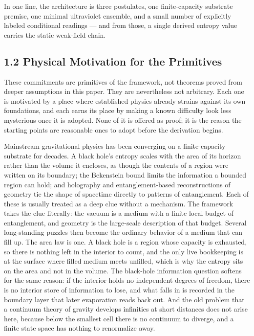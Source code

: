 \documentclass[11pt]{article}
\begin{document}
In one line, the architecture is three postulates, one finite-capacity substrate premise, one minimal ultraviolet ensemble, and a small number of explicitly labeled conditional readings --- and from those, a single derived entropy value carries the static weak-field chain.

\subsection{1.2 Physical Motivation for the Primitives}

These commitments are primitives of the framework, not theorems proved from deeper assumptions in this paper. They are nevertheless not arbitrary. Each one is motivated by a place where established physics already strains against its own foundations, and each earns its place by making a known difficulty look less mysterious once it is adopted. None of it is offered as proof; it is the reason the starting points are reasonable ones to adopt before the derivation begins.

Mainstream gravitational physics has been converging on a finite-capacity substrate for decades. A black hole's entropy scales with the area of its horizon rather than the volume it encloses, as though the contents of a region were written on its boundary; the Bekenstein bound limits the information a bounded region can hold; and holography and entanglement-based reconstructions of geometry tie the shape of spacetime directly to patterns of entanglement. Each of these is usually treated as a deep clue without a mechanism. The framework takes the clue literally: the vacuum is a medium with a finite local budget of entanglement, and geometry is the large-scale description of that budget. Several long-standing puzzles then become the ordinary behavior of a medium that can fill up. The area law is one. A black hole is a region whose capacity is exhausted, so there is nothing left in the interior to count, and the only live bookkeeping is at the surface where filled medium meets unfilled, which is why the entropy sits on the area and not in the volume. The black-hole information question softens for the same reason: if the interior holds no independent degrees of freedom, there is no interior store of information to lose, and what falls in is recorded in the boundary layer that later evaporation reads back out. And the old problem that a continuum theory of gravity develops infinities at short distances does not arise here, because below the smallest cell there is no continuum to diverge, and a finite state space has nothing to renormalize away.
\end{document}
